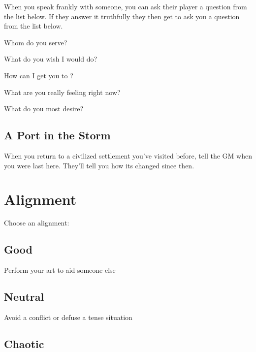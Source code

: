 When you speak frankly with someone, you can ask their player a question from the list below. If they answer it truthfully they then get to ask you a question from the list below.

 
\startitemize[1,packed]

\item Whom do you serve?

 
\item What do you wish I would do?

 
\item How can I get you to \thinrules[2]?

 
\item What are you really feeling right now?

 
\item What do you most desire?


\stopitemize
 
\subsection{A Port in the Storm}    
 

When you return to a civilized settlement you've visited before, tell the GM when you were last here. They'll tell you how its changed since then.





 
\section{Alignment}   
 
\startInstructionsAfterHeader
Choose an alignment:
\stopInstructionsAfterHeader
 


\subsection{Good}   
 

Perform your art to aid someone else

 
\subsection{Neutral}   
 

Avoid a conflict or defuse a tense situation

 
\subsection{Chaotic}   
 

